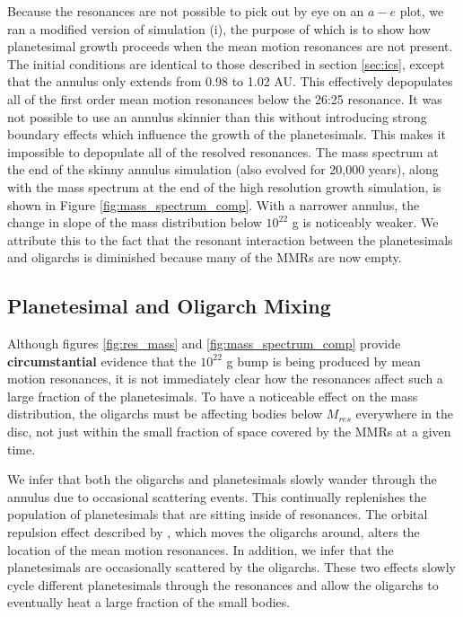 
Because the resonances are not possible to pick out by eye on an $a-e$ plot, we ran a modified version of simulation (i), the 
purpose of which is to show how planetesimal growth proceeds when the mean motion resonances are not present. The initial 
conditions are identical to those described in section \ref{sec:ics}, except that the annulus only extends from 0.98 to 1.02 AU. 
This effectively depopulates all of the first order mean motion resonances below the 26:25 resonance. It was not possible to use 
an annulus skinnier than this without introducing strong boundary effects which influence the growth of the planetesimals. This 
makes it impossible to depopulate all of the resolved resonances. The mass spectrum at the end of the skinny annulus 
simulation (also evolved for 20,000 years), along with the mass spectrum at the end of the high resolution growth simulation, is 
shown in Figure \ref{fig:mass_spectrum_comp}. With a narrower annulus, the change in slope of the mass distribution below 
$10^{22}$ g is noticeably weaker. We attribute this to the fact that the resonant interaction between the planetesimals and 
oligarchs is diminished because many of the MMRs are now empty.

\subsection{Planetesimal and Oligarch Mixing}\label{sec:mix}

Although figures \ref{fig:res_mass} and \ref{fig:mass_spectrum_comp} provide \textbf{circumstantial} evidence that the $10^{22}$ g bump is 
being produced by mean motion resonances, it is not immediately clear how the resonances affect such a large fraction of the 
planetesimals. To have a noticeable effect on the mass distribution, the oligarchs must be affecting bodies below $M_{res}$ 
everywhere in the disc, not just within the small fraction of space covered by the MMRs at a given time.

We infer that both the oligarchs and planetesimals slowly wander through the annulus due to occasional scattering events. This 
continually replenishes the population of planetesimals that are sitting inside of resonances. The orbital repulsion effect 
described by \cite{kokubo98}, which moves the oligarchs around, alters the location of the mean motion resonances. 
In addition, we infer that the planetesimals are occasionally scattered by the oligarchs. These two effects slowly cycle different 
planetesimals through the resonances and allow the oligarchs to eventually heat a large fraction of the small bodies.

